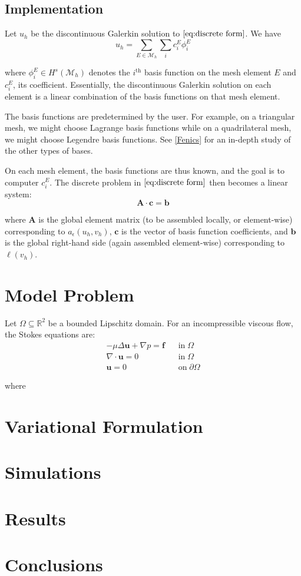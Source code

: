 \documentclass[10pt]{article}
\numberwithin{equation}{section}
\begin{document}
	\subsection{Implementation}
	Let $u_{h}$ be the discontinuous Galerkin solution to $\eqref{eq:discrete form}$. We have
	\begin{equation*}
		u_{h} = \sum_{E\in\mathcal{M}_{h}}\sum_{i}c_{i}^{E}\phi_{i}^{E}
	\end{equation*}
	
	\noindent where $\phi_{i}^{E} \in H^{s}(\mathcal{M}_{h})$ denotes the $i^{\text{th}}$ basis function on the mesh element $E$ and $c_{i}^{E}$, its coefficient. Essentially, the discontinuous Galerkin solution on each element is a linear combination of the basis functions on that mesh element. 
	
	The basis functions are predetermined by the user. For example, on a triangular mesh, we might choose Lagrange basis functions while on a quadrilateral mesh, we might choose Legendre basis functions. See \ref{Fenics} for an in-depth study of the other types of bases.
	
	On each mesh element, the basis functions are thus known, and the goal is to computer $c_{i}^{E}$. The discrete problem in $\eqref{eq:discrete form}$ then becomes a linear system:
	\begin{equation*}
		\mathbf{A}\cdot\mathbf{c} = \mathbf{b}
	\end{equation*}
	
	\noindent where $\mathbf{A}$ is the global element matrix (to be assembled locally, or element-wise) corresponding to $a_{\epsilon}(u_{h},v_{h})$, $\mathbf{c}$ is the vector of basis function coefficients, and $\mathbf{b}$ is the global right-hand side (again assembled element-wise) corresponding to $\ell(v_{h})$.
	
	\section{Model Problem}
	
	Let $\Omega \subseteq \mathbb{R}^{2}$ be a bounded Lipschitz domain. For an incompressible viscous flow, the Stokes equations are:
	\begin{align}
		-\mu\Delta \mathbf{u} + \nabla p = \mathbf{f} \;\;\;&\text{in}\;\Omega\\
		\nabla\cdot\mathbf{u} = 0 \;\;\;&\text{in}\;\Omega\\
		\mathbf{u} = 0 \;\;\;&\text{on}\;\partial\Omega
	\end{align}
	
	\noindent where
	
	\section{Variational Formulation}
	
	\section{Simulations}
	
	\section{Results}
	
	\section{Conclusions}
	
\end{document}
